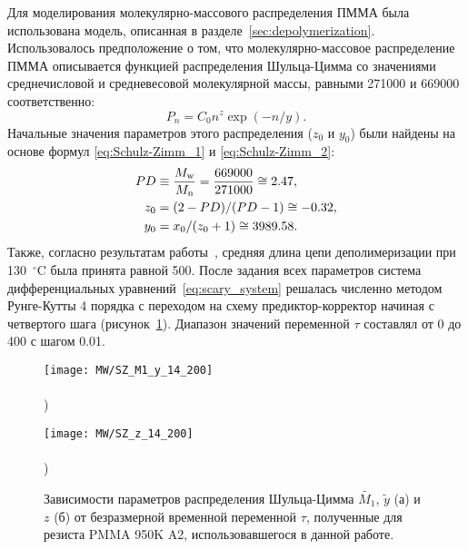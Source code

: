 Для моделирования молекулярно-массового распределения ПММА была использована модель, описанная в разделе~\ref{sec:depolymerization}.
Использовалось предположение о том, что молекулярно-массовое распределение ПММА описывается функцией распределения Шульца-Цимма со значениями среднечисловой и средневесовой молекулярной массы, равными 271000 и 669000 соответственно:
\begin{equation} \label{eq:Schulz-Zimm_distribution}
	P_n = C_0 n^z \exp (-n/y).
\end{equation}
Начальные значения параметров этого распределения ($z_0$ и $y_0$) были найдены на основе формул \ref{eq:Schulz-Zimm_1} и \ref{eq:Schulz-Zimm_2}:
\begin{equation}
	\begin{aligned}
		PD & \equiv \frac{M_\mathrm{w}}{M_\mathrm{n}} = \frac{669000}{271000} \cong 2.47, \\
		z_0 & = (2-PD)/(PD-1) \cong -0.32, \\
		y_0 & = x_0/(z_0+1) \cong 3989.58.
	\end{aligned}
\end{equation}
Также, согласно результатам работы~\cite{Mita_PMMA_zip_lengths_T}, средняя длина цепи деполимеризации при 130~$^\circ$C была принята равной 500.
После задания всех параметров система дифференциальных уравнений~\ref{eq:scary_system} решалась численно методом Рунге-Кутты 4 порядка с переходом на схему предиктор-корректор начиная с четвертого шага (рисунок~\ref{fig:SZ_M1_y_tau}).
Диапазон значений переменной $\tau$ составлял от 0 до 400 с шагом 0.01.
\begin{figure}[t]
	\begin{minipage}{0.48\textwidth}
			\hspace{-0.5em} \texttt{[image: MW/SZ\_M1\_y\_14\_200]} \\
			\vspace{-12.5ex} \\ ) \\ \vspace{12.5ex}
		\end{minipage}
	\begin{minipage}{0.48\textwidth}
			\texttt{[image: MW/SZ\_z\_14\_200]} \\
			\vspace{-12.5ex} \\ ) \\ \vspace{12.5ex}
		\end{minipage}
	\vspace{-3.5em}
	\caption{
		Зависимости параметров распределения Шульца-Цимма $\tilde{M_1}$, $\tilde{y}$ (а) и $z$ (б) от безразмерной временной переменной $\tau$, полученные для резиста PMMA 950K A2, использовавшегося в данной работе.
	}
	\label{fig:SZ_M1_y_tau}
\end{figure}
